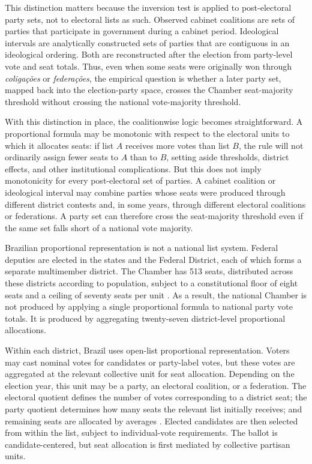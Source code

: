 \documentclass[11pt]{article}
\begin{document}
This distinction matters because the inversion test is applied to post-electoral
party sets, not to electoral lists as such. Observed cabinet coalitions are sets of
parties that participate in government during a cabinet period. Ideological
intervals are analytically constructed sets of parties that are contiguous in an
ideological ordering. Both are reconstructed after the election from party-level
vote and seat totals. Thus, even when some seats were originally won through
\emph{coligações} or \emph{federações}, the empirical question is whether a later
party set, mapped back into the election-party space, crosses the Chamber
seat-majority threshold without crossing the national vote-majority threshold.

With this distinction in place, the coalitionwise logic becomes straightforward.
A proportional formula may be monotonic with respect to the electoral units to
which it allocates seats: if list $A$ receives more votes than list $B$, the rule
will not ordinarily assign fewer seats to $A$ than to $B$, setting aside
thresholds, district effects, and other institutional complications. But this
does not imply monotonicity for every post-electoral set of parties. A cabinet
coalition or ideological interval may combine parties whose seats were produced
through different district contests and, in some years, through different
electoral coalitions or federations. A party set can therefore cross the
seat-majority threshold even if the same set falls short of a national vote
majority.

Brazilian proportional representation is not a national list system. Federal
deputies are elected in the states and the Federal District, each of which forms
a separate multimember district. The Chamber has 513 seats, distributed across
these districts according to population, subject to a constitutional floor of eight
seats and a ceiling of seventy seats per unit
\parencite{camaraDeputadosNumeroEstados}. As a result, the national Chamber is
not produced by applying a single proportional formula to national party vote
totals. It is produced by aggregating twenty-seven district-level proportional
allocations.

Within each district, Brazil uses open-list proportional representation. Voters may
cast nominal votes for candidates or party-label votes, but these votes are
aggregated at the relevant collective unit for seat allocation. Depending on the
election year, this unit may be a party, an electoral coalition, or a federation.
The electoral quotient defines the number of votes corresponding to a district
seat; the party quotient determines how many seats the relevant list initially
receives; and remaining seats are allocated by averages
\parencite{tse2023quocientes,tse2022federacoes}. Elected candidates are then
selected from within the list, subject to individual-vote requirements. The ballot
is candidate-centered, but seat allocation is first mediated by collective partisan
units.
\end{document}
